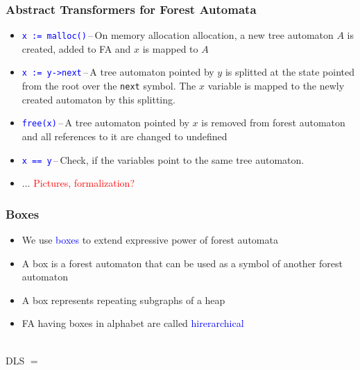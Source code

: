 \documentclass{beamer}
\newcommand{\hlbl}[1]{\textcolor{blue}{#1}}
\newcommand{\hlrd}[1]{\textcolor{red}{#1}}
\begin{document}
\begin{frame}
\frametitle{Abstract Transformers for Forest Automata}

	\begin{itemize}
		\item \hlbl{\texttt{x := malloc()}}\,--\,On memory allocation allocation, a new tree automaton $A$
			is created, added to FA and $x$ is mapped to $A$
		\item \hlbl{\texttt{x := y->next}}\,--\,A tree automaton pointed by $y$ is splitted at the state
			pointed from the root over the \texttt{next} symbol. The $x$ variable is mapped to the newly
			created automaton by this splitting.
		\item \hlbl{\texttt{free(x)}}\,--\,A tree automaton pointed by $x$ is removed from forest automaton
			and all references to it are changed to undefined
		\item \hlbl{\texttt{x == y}}\,--\,Check, if the variables point to the same tree automaton.
		\item $\ldots$ \hlrd{Pictures, formalization?}
	\end{itemize}

\end{frame}


\begin{frame}
\frametitle{Boxes}

\begin{itemize}
		\item We use \hlbl{boxes} to extend expressive power of forest automata
		\item A box is a forest automaton that can be used as a symbol of another forest automaton
		\item A box represents repeating subgraphs of a heap
		\item FA having boxes in alphabet are called \hlbl{hirerarchical}
	\end{itemize}
		\vspace{-0.8cm}
		\centering \\
		\vspace{0.7cm}
		\centering DLS $=$ \\
		\vspace{-0.8cm}
		\centering 
\end{frame}
\end{document}
